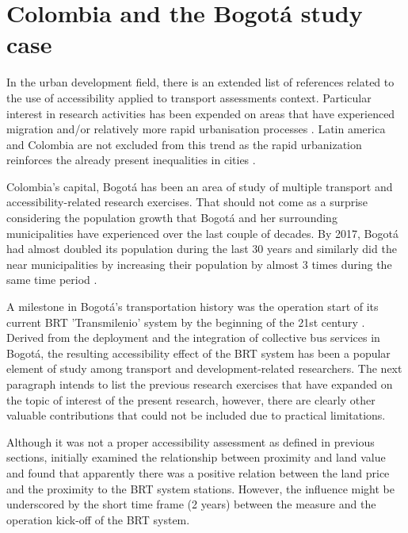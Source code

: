 \documentclass[12pt, a4paper]{report}
\begin{document}
\section{Colombia and the Bogot\'{a} study case}

In the urban development field, there is an extended list of references related to the use of accessibility applied to transport assessments context. Particular interest in research activities has been expended on areas that have experienced migration and/or relatively more rapid urbanisation processes \citep{kojimaIntroductionPopulationMigration1996}. Latin america and Colombia are not excluded from this trend as the rapid urbanization reinforces the already present inequalities in cities \citep{wrightwendelAccessibilityUsabilityGreen2012,tellezUrbanDevelopmentBogota2018}.


Colombia's capital, Bogot\'{a} has been an area of study of multiple transport and accessibility-related research exercises. That should not come as a surprise considering the population growth that Bogot\'{a} and her surrounding municipalities have experienced over the last couple of decades. By 2017, Bogot\'{a} had almost doubled its population during the last 30 years and similarly did the near municipalities by increasing their population by almost 3 times during the same time period \citep{guzmanCityProfileBogota2017}.

A milestone in Bogotá's transportation history was the operation start of its current BRT 'Transmilenio' system by the beginning of the 21st century \citep{rodriguezValueAccessibilityBogota2004}. Derived from the deployment and the integration of collective bus services in Bogotá, the resulting accessibility effect of the BRT system has been a popular element of study among transport and development-related researchers. The next paragraph intends to list the previous research exercises that have expanded on the topic of interest of the present research, however, there are clearly other valuable contributions that could not be included due to practical limitations.


Although it was not a proper accessibility assessment as defined in previous sections, \cite{rodriguezValueAccessibilityBogota2004} initially examined the relationship between proximity and land value and found that apparently there was a positive relation between the land price and the proximity to the BRT system stations. However, the influence might be underscored by the short time frame (2 years) between the measure and the operation kick-off of the BRT system.
\end{document}
